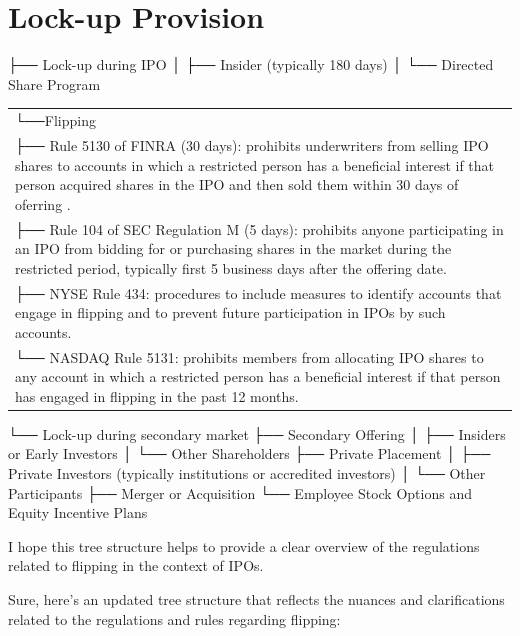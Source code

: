 \documentclass[11pt]{article}
\begin{document}
\section{Lock-up Provision}
\label{sec:orge08fc45}
├── Lock-up during IPO
│   ├── Insider (typically 180 days)
│   └── Directed Share Program
\begin{center}
\begin{tabular}{l}
└──Flipping\\[0pt]
├── Rule 5130 of FINRA (30 days): prohibits underwriters from selling IPO shares to accounts in which a restricted person has a beneficial interest if that person acquired shares in the IPO and then sold them within 30 days of oferring .\\[0pt]
├── Rule 104 of SEC Regulation M (5 days): prohibits anyone participating in an IPO from bidding for or purchasing shares in the market during the restricted period, typically first 5 business days after the offering date.\\[0pt]
├── NYSE Rule 434: procedures to include measures to identify accounts that engage in flipping and to prevent future participation in IPOs by such accounts.\\[0pt]
└── NASDAQ Rule 5131: prohibits members from allocating IPO shares to any account in which a restricted person has a beneficial interest if that person has engaged in flipping in the past 12 months.\\[0pt]
\end{tabular}
\end{center}
└── Lock-up during secondary market
    ├── Secondary Offering
    │   ├── Insiders or Early Investors
    │   └── Other Shareholders
    ├── Private Placement
    │   ├── Private Investors (typically institutions or accredited investors)
    │   └── Other Participants
    ├── Merger or Acquisition
    └── Employee Stock Options and Equity Incentive Plans




I hope this tree structure helps to provide a clear overview of the regulations related to flipping in the context of IPOs.


Sure, here's an updated tree structure that reflects the nuances and clarifications related to the regulations and rules regarding flipping:
\end{document}
